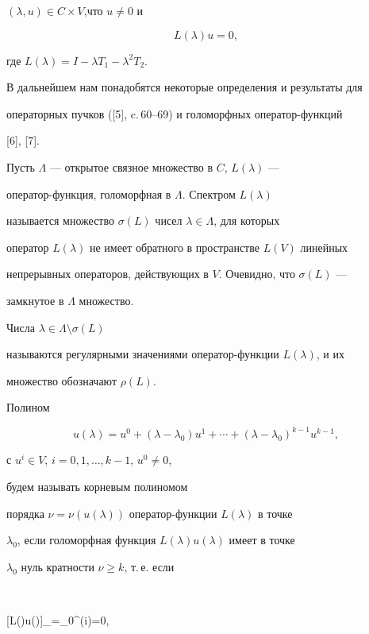 $(\lambda, u)\in C\times V$,что $u\neq 0$ и


\begin{equation}


L(\lambda)u=0,


\end{equation}


где $L(\lambda)=I-\lambda T_1-\lambda^{2}T_2.$





В дальнейшем нам понадобятся некоторые определения и результаты для


операторных пучков ([5], c.\,60--69) и голоморфных оператор-функций


[6], [7].


Пусть $\Lambda$ --- открытое связное множество в $C$, $L(\lambda)$ ---


оператор-функция, голоморфная в $\Lambda$. Спектром $L(\lambda)$


называется множество $\sigma(L)$ чисел $\lambda \in \Lambda$, для которых


оператор $L(\lambda)$ не имеет обратного в пространстве $ L(V)$ линейных


непрерывных операторов, действующих в $V$. Очевидно, что $\sigma(L)$ ---


замкнутое в $\Lambda$ множество.


Числа $\lambda \in \Lambda \setminus\sigma(L)$


называются регулярными значениями оператор-функции $L(\lambda)$, и их


множество обозначают $\rho (L)$.


Полином


$$


u(\lambda)=u^0+(\lambda-\lambda_0)u^1+\dotsb


+(\lambda-\lambda_0)^{k-1}u^{k-1},


$$


с $u^i\in V$, $i=0,1,\dotsc,k-1$, $u^0\neq 0$,


будем называть корневым полиномом


порядка $\nu=\nu(u(\lambda))$ оператор-функции $L(\lambda)$ в точке


$\lambda_0$, если голоморфная функция $L(\lambda)u(\lambda)$ имеет в точке


$\lambda_0$ нуль кратности $\nu\ge k$, т.\,е. если


$$


[L(\lambda)u(\lambda)]_{\lambda=\lambda_0}^{(i)}=0,


